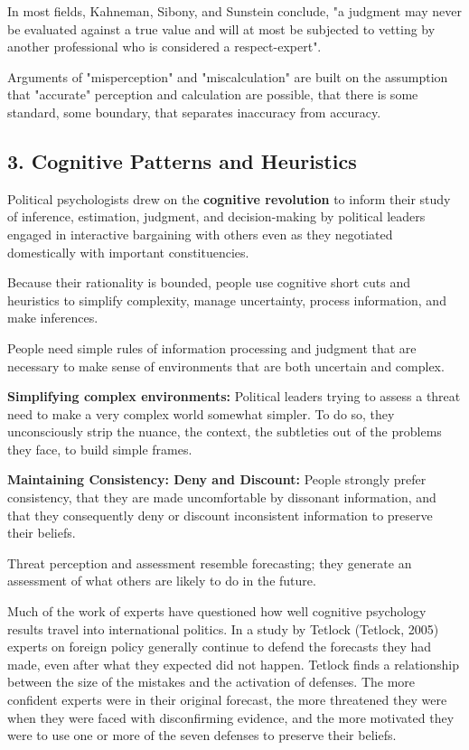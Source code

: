 In most fields, Kahneman, Sibony, and Sunstein conclude, "a judgment may never be evaluated against a true value and will at most be subjected to vetting by another professional who is considered a respect-expert".

Arguments of "misperception" and "miscalculation" are built on the assumption that "accurate" perception
and calculation are possible, that there is some standard, some boundary, that separates inaccuracy from
accuracy.

\subsection{3. Cognitive Patterns and Heuristics}
Political psychologists drew on the \textbf{cognitive revolution} to inform their study of inference, estimation, judgment, and decision-making by political leaders engaged in interactive bargaining with others even as they negotiated domestically with important constituencies.

Because their rationality is bounded, people use cognitive short cuts and heuristics to simplify complexity, manage uncertainty, process information, and make inferences.

People need simple rules of information processing and judgment that are necessary to make sense of environments that are both uncertain and complex.

\textbf{Simplifying complex environments:} Political leaders trying to assess a threat need to make a very complex world somewhat simpler. To do so, they unconsciously strip the nuance, the context, the subtleties out of the problems they face, to build simple frames.

\textbf{Maintaining Consistency: Deny and Discount:} People strongly prefer consistency, that they are made uncomfortable by dissonant information, and that they consequently deny or discount inconsistent information to preserve their beliefs.

Threat perception and assessment resemble forecasting; they generate an assessment of what others are likely to do in the future.

Much of the work of experts have questioned how well cognitive psychology results travel into international politics.
In a study by Tetlock (Tetlock, 2005) experts on foreign policy generally continue to defend the forecasts they had made, even after what they expected did not happen.
Tetlock finds a relationship between the size of the mistakes and the activation of defenses. The more confident experts were in their original forecast, the more threatened they were when they were faced with disconfirming evidence, and the more motivated they were to use one or more of the seven defenses to preserve their beliefs.

